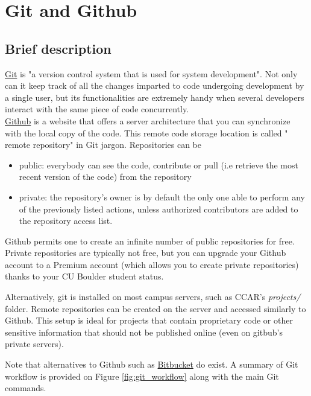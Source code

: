 
\section{Git and Github}

\subsection{Brief description}

\href{https://en.wikipedia.org/wiki/Git_(software)}{Git} is "a version control system that is used for system development". Not only can it keep track of all the changes imparted to code undergoing development by a single user, but its functionalities are extremely handy when several developers interact with the same piece of code concurrently.\\

\noindent
\href{https://github.com/}{Github} is a website that offers a server architecture that you can synchronize with the local copy of the code. This remote code storage location is called " remote repository" in Git jargon. Repositories can be

\begin{itemize}
\item public: everybody can see the code, contribute or pull (i.e retrieve the most recent version of the code) from the repository
\item private: the repository's owner is by default the only one able to perform any of the previously listed actions, unless authorized contributors are added to the repository access list.
\end{itemize} 

Github permits one to create an infinite number of public repositories for free. Private repositories are typically not free, but you can upgrade your Github account to a Premium account (which allows you to create private repositories) thanks to your CU Boulder student status.

Alternatively, git is installed on most campus servers, such as CCAR's \textit{projects/} folder. Remote repositories can be created on the server and accessed similarly to Github. This setup is ideal for projects that contain proprietary code or other sensitive information that should not be published online (even on gitbub's private servers).

Note that alternatives to Github such as \href{https://bitbucket.org}{Bitbucket}  do exist.
A summary of Git workflow is provided on Figure \ref{fig:git_workflow} along with the main Git commands.

